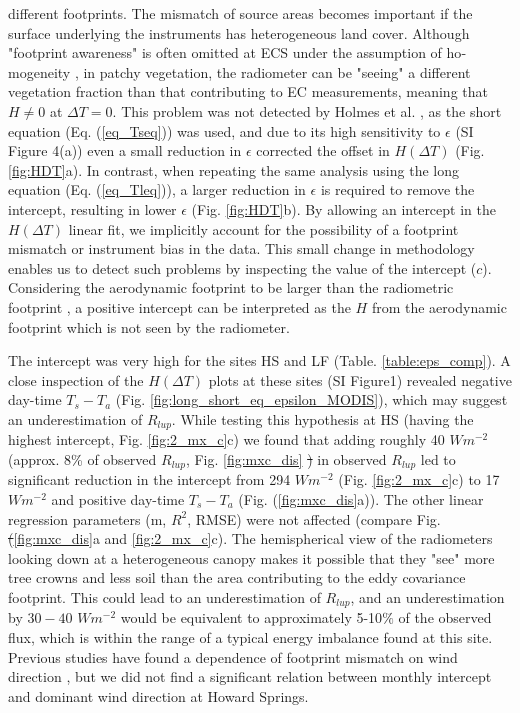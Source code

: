 \documentclass[fleqn,10pt]{wlscirep}
\providecommand{\DIFaddtex}[1]{{\protect\color{blue}\uwave{#1}}} %
\providecommand{\DIFdeltex}[1]{{\protect\color{red}\sout{#1}}}                      %
\providecommand{\DIFaddbegin}{} %
\providecommand{\DIFaddend}{} %
\providecommand{\DIFdelbegin}{} %
\providecommand{\DIFdelend}{} %
\providecommand{\DIFadd}[1]{\texorpdfstring{\DIFaddtex{#1}}{#1}} %
\providecommand{\DIFdel}[1]{\texorpdfstring{\DIFdeltex{#1}}{}} %
\begin{document}
different footprints\cite{marcolla2018geometry}. The mismatch of source areas becomes important if the surface underlying the instruments has heterogeneous land cover. 
 Although "footprint awareness" is often omitted at ECS under the assumption of ho­mogeneity \cite{chu2021representativeness}, in patchy vegetation, the radiometer can be "seeing" a different vegetation fraction than that contributing to EC measurements, meaning that $H\not= 0$ at $\Delta T=0$. This problem was not detected by Holmes et al. \cite{holmes2009land}, as the short equation (Eq. (\ref{eq_Tseq})) was used, and due to its high sensitivity to $\epsilon$ (SI Figure 4(a)) even a small reduction in $\epsilon$ corrected the offset in $H(\Delta T)$ (Fig. \ref{fig:HDT}a). In contrast, when repeating the same analysis using the long equation (Eq. (\ref{eq_Tleq})), a larger reduction in $\epsilon$ is required to remove the intercept, resulting in lower $\epsilon$ (Fig. \ref{fig:HDT}b). By allowing an intercept in the $H(\Delta T)$ linear fit, we implicitly account for the possibility of a footprint mismatch or instrument bias in the data. This small change in methodology enables us to detect such problems by inspecting the value of the intercept ($c$). Considering  the aerodynamic footprint to be larger than the radiometric footprint \cite{marcolla2018geometry,chu2021representativeness}, a positive intercept can be interpreted as the $H$ from the aerodynamic footprint which is not seen by the radiometer. 

The intercept was very high for the sites HS and LF (Table. \ref{table:eps_comp}). A close inspection of the $H(\Delta T)$ plots at these sites (SI Figure1) revealed negative day-time \DIFdelbegin \DIFdel{$T_{s} -T_{a}$ }\DIFdelend \DIFaddbegin \DIFadd{$T_{s} - T_{a}$ }\DIFaddend (Fig. \ref{fig:long_short_eq_epsilon_MODIS}), which may suggest an underestimation of $R_{lup}$. While testing this hypothesis at HS (having the highest intercept, Fig. \ref{fig:2_mx_c}c) we found that adding roughly 40 $Wm^{-2}$ (approx. 8\% of observed $R_{lup}$, Fig. \ref{fig:mxc_dis} \DIFdelbegin \DIFdel{) }\DIFdelend in observed $R_{lup}$ led to significant reduction in the intercept from 294 $Wm^{-2}$ (Fig. \ref{fig:2_mx_c}c) to 17 $Wm^{-2}$ and positive day-time $T_{s} - T_{a}$ (Fig. (\ref{fig:mxc_dis}a)). The other linear regression parameters (m, $R^{2}$, RMSE) were not affected (compare Fig. \DIFdelbegin \DIFdel{(}\DIFdelend \ref{fig:mxc_dis}a and \DIFaddbegin \DIFadd{Fig. }\DIFaddend \ref{fig:2_mx_c}c). The hemispherical view of the radiometers looking down at a heterogeneous canopy makes it possible that they "see" more tree crowns and less soil than the area contributing to the eddy covariance footprint. This could lead to an underestimation of $R_{lup}$, and an underestimation by $30-40$ $Wm^{-2}$ would be equivalent to approximately 5-10$\%$ of the observed flux, which is within the range of a typical energy imbalance found at this site. Previous studies have found a dependence of footprint mismatch on wind direction \cite{chu2021representativeness,marcolla2018geometry,morillas2013using}, but we did not find a significant relation between monthly intercept and dominant wind direction at Howard Springs.
\end{document}
